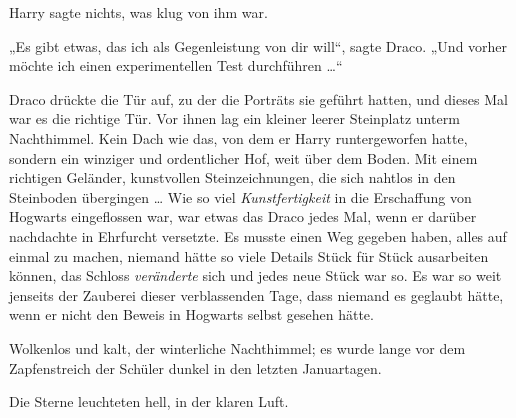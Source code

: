 Harry sagte nichts, was klug von ihm war.

„Es gibt etwas, das ich als Gegenleistung von dir will“, sagte Draco.
„Und vorher möchte ich einen experimentellen Test durchführen …“

\later

Draco drückte die Tür auf, zu der die Porträts sie geführt hatten, und dieses Mal war es die richtige Tür. Vor ihnen lag ein kleiner leerer Steinplatz unterm Nachthimmel. Kein Dach wie das, von dem er Harry runtergeworfen hatte, sondern ein winziger und ordentlicher Hof, weit über dem Boden. Mit einem richtigen Geländer, kunstvollen Steinzeichnungen, die sich nahtlos in den Steinboden übergingen … Wie so viel \emph{Kunstfertigkeit} in die Erschaffung von Hogwarts eingeflossen war, war etwas das Draco jedes Mal, wenn er darüber nachdachte in Ehrfurcht versetzte. Es musste einen Weg gegeben haben, alles auf einmal zu machen, niemand hätte so viele Details Stück für Stück ausarbeiten können, das Schloss \emph{veränderte} sich und jedes neue Stück war so. Es war so weit jenseits der Zauberei dieser verblassenden Tage, dass niemand es geglaubt hätte, wenn er nicht den Beweis in Hogwarts selbst gesehen hätte.

Wolkenlos und kalt, der winterliche Nachthimmel; es wurde lange vor dem Zapfenstreich der Schüler dunkel in den letzten Januartagen.

Die Sterne leuchteten hell, in der klaren Luft.

